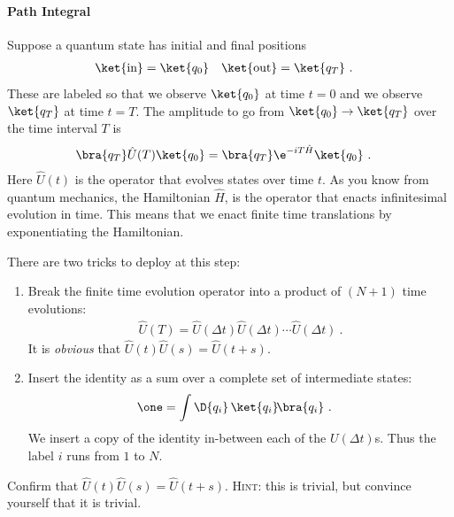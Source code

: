 \paragraph{Path Integral}
Suppose a quantum state has initial and final positions
\begin{align}
    \ket{\textnormal{in}} &= \ket{q_0}
    &
    \ket{\textnormal{out}} &= \ket{q_T} \ .
\end{align}
These are labeled so that we observe $\ket{q_0}$ at time $t=0$ and we observe $\ket{q_T}$ at time $t=T$. The amplitude to go from $\ket{q_0} \to \ket{q_T}$ over the time interval $T$ is
\begin{align}
    \bra{q_T} \hat U(T) \ket{q_0} &= \bra{q_T} \e^{-iT\hat H} \ket{q_0} \ .
\end{align}
Here $\hat U(t)$ is the operator that evolves states over time $t$. As you know from quantum mechanics, the Hamiltonian $\hat H$, is the operator that enacts infinitesimal evolution in time. This means that we enact finite time translations by exponentiating the Hamiltonian.

There are two tricks to deploy at this step:
\begin{enumerate}
    \item Break the finite time evolution operator into a product of $(N+1)$ time evolutions:
    \begin{align}
        \hat U(T) = \hat U(\Delta t)\hat U(\Delta t)\cdots \hat U(\Delta t) \ .
    \end{align}
    It is \emph{obvious} that $\hat U(t)\hat U(s) = \hat U(t+s)$.
    \item Insert the identity as a sum over a complete set of intermediate states:
    \begin{align}
        \one &= \int \D{q_i}\, \ket{q_i}\!\bra{q_i} \ .
    \end{align}
    We insert a copy of the identity in-between each of the $U(\Delta t)$s. Thus the label $i$ runs from $1$ to $N$.
\end{enumerate}
\begin{exercise}
Confirm that $\hat U(t)\hat U(s) = \hat U(t+s)$. \textsc{Hint}: this is trivial, but convince yourself that it is trivial.
\end{exercise}

